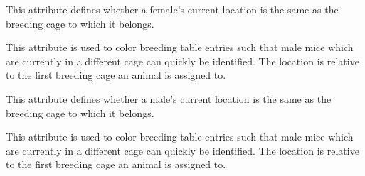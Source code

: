 \documentclass[letterpaper,10pt,english]{sphinxmanual}
\begin{document}
\begin{fulllineitems}
\begin{fulllineitems}
\label{api:mousedb.animal.models.Animal.breeding_female_location_type}
This attribute defines whether a female's current location is the same as the breeding cage to which it belongs.

This attribute is used to color breeding table entries such that male mice which are currently in a different cage can quickly be identified.
The location is relative to the first breeding cage an animal is assigned to.

\end{fulllineitems}


\begin{fulllineitems}
\label{api:mousedb.animal.models.Animal.breeding_females}
\end{fulllineitems}


\begin{fulllineitems}
\label{api:mousedb.animal.models.Animal.breeding_male_location_type}
This attribute defines whether a male's current location is the same as the breeding cage to which it belongs.

This attribute is used to color breeding table entries such that male mice which are currently in a different cage can quickly be identified.
The location is relative to the first breeding cage an animal is assigned to.

\end{fulllineitems}


\begin{fulllineitems}
\label{api:mousedb.animal.models.Animal.breeding_males}
\end{fulllineitems}


\begin{fulllineitems}
\label{api:mousedb.animal.models.Animal.father}
\end{fulllineitems}


\end{fulllineitems}
\end{document}
